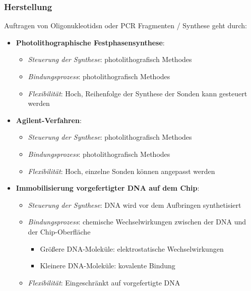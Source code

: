 \subsubsection{Herstellung}
Auftragen von \glspl{Oligonukleotid}n oder PCR Fragmenten / Synthese geht durch:
\begin{itemize}
            \item \textbf{Photolithographische Festphasensynthese}: 
            \begin{itemize} 
                \item \textit{Steuerung der Synthese}: \glspl{photolithografisch Methode}
                \item \textit{Bindungsprozess}: \glspl{photolithografisch Methode}
                \item \textit{Flexibilität}: Hoch, Reihenfolge der Synthese der Sonden kann gesteuert werden
            \end{itemize}
            \item \textbf{Agilent-Verfahren}: 
            \begin{itemize} 
                \item \textit{Steuerung der Synthese}: \glspl{photolithografisch Methode}
                \item \textit{Bindungsprozess}: \glspl{photolithografisch Methode}
                \item \textit{Flexibilität}: Hoch, einzelne Sonden können angepasst werden 
            \end{itemize}
            \item \textbf{Immobilisierung vorgefertigter DNA auf dem Chip}: 
            \begin{itemize}
                \item \textit{Steuerung der Synthese}: DNA wird vor dem Aufbringen synthetisiert 
                \item \textit{Bindungsprozess}: chemische Wechselwirkungen zwischen der DNA und der Chip-Oberfläche
                \begin{itemize}
                    \item Größere DNA-Moleküle: elektrostatische Wechselwirkungen
                    \item Kleinere DNA-Moleküle: kovalente Bindung
                \end{itemize}
                \item \textit{Flexibilität}: Eingeschränkt auf vorgefertigte DNA 
            \end{itemize}
        \end{itemize}


